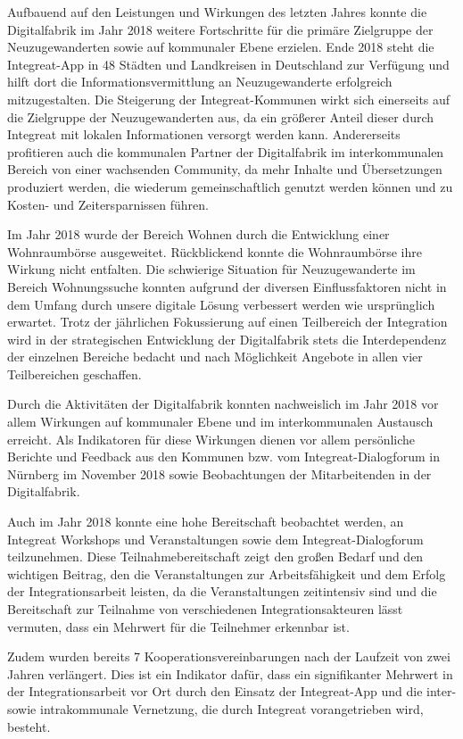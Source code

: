 \documentclass[12pt, a4paper]{article} %
\begin{document}
Aufbauend auf den Leistungen und Wirkungen des letzten Jahres konnte die
Digitalfabrik im Jahr 2018 weitere Fortschritte für die primäre
Zielgruppe der Neuzugewanderten sowie auf kommunaler Ebene erzielen.
Ende 2018 steht die Integreat-App in 48 Städten und Landkreisen in
Deutschland zur Verfügung und hilft dort die Informationsvermittlung an
Neuzugewanderte erfolgreich mitzugestalten. Die Steigerung der
Integreat-Kommunen wirkt sich einerseits auf die Zielgruppe der
Neuzugewanderten aus, da ein größerer Anteil dieser durch Integreat mit
lokalen Informationen versorgt werden kann. Andererseits profitieren
auch die kommunalen Partner der Digitalfabrik im interkommunalen Bereich
von einer wachsenden Community, da mehr Inhalte und Übersetzungen
produziert werden, die wiederum gemeinschaftlich genutzt werden können
und zu Kosten- und Zeitersparnissen führen.

Im Jahr 2018 wurde der Bereich Wohnen durch die Entwicklung einer Wohnraumbörse
ausgeweitet. Rückblickend konnte die Wohnraumbörse ihre Wirkung nicht
entfalten. Die schwierige Situation für Neuzugewanderte im Bereich
Wohnungssuche konnten aufgrund der diversen Einflussfaktoren nicht in
dem Umfang durch unsere digitale Lösung verbessert werden wie
ursprünglich erwartet. Trotz der jährlichen Fokussierung auf einen
Teilbereich der Integration wird in der strategischen Entwicklung der
Digitalfabrik stets die Interdependenz der einzelnen Bereiche bedacht
und nach Möglichkeit Angebote in allen vier Teilbereichen geschaffen.

Durch die Aktivitäten der Digitalfabrik konnten nachweislich im Jahr
2018 vor allem Wirkungen auf kommunaler Ebene und im interkommunalen
Austausch erreicht. Als Indikatoren für diese Wirkungen dienen vor allem
persönliche Berichte und Feedback aus den Kommunen bzw. vom
Integreat-Dialogforum in Nürnberg im November 2018 sowie Beobachtungen
der Mitarbeitenden in der Digitalfabrik.

Auch im Jahr 2018 konnte eine hohe Bereitschaft beobachtet werden, an
Integreat Workshops und Veranstaltungen sowie dem Integreat-Dialogforum
teilzunehmen. Diese Teilnahmebereitschaft zeigt den großen Bedarf und
den wichtigen Beitrag, den die Veranstaltungen zur Arbeitsfähigkeit und
dem Erfolg der Integrationsarbeit leisten, da die Veranstaltungen
zeitintensiv sind und die Bereitschaft zur Teilnahme von verschiedenen
Integrationsakteuren lässt vermuten, dass ein Mehrwert für die
Teilnehmer erkennbar ist.

Zudem wurden bereits 7 Kooperationsvereinbarungen nach der Laufzeit von
zwei Jahren verlängert. Dies ist ein Indikator dafür, dass ein
signifikanter Mehrwert in der Integrationsarbeit vor Ort durch den
Einsatz der Integreat-App und die inter- sowie intrakommunale
Vernetzung, die durch Integreat vorangetrieben wird, besteht.
\end{document}
